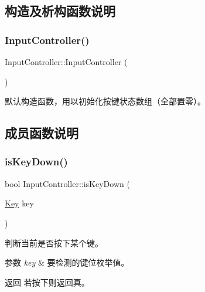\subsection{构造及析构函数说明}
\mbox{\label{class_input_controller_aba927fffeb0bf4c4fd0835d4dfbdfaec}} 
\subsubsection{\texorpdfstring{Input\+Controller()}{InputController()}}
{\footnotesize\ttfamily Input\+Controller\+::\+Input\+Controller (\begin{DoxyParamCaption}{ }\end{DoxyParamCaption})}



默认构造函数，用以初始化按键状态数组（全部置零）。 



\subsection{成员函数说明}
\mbox{\label{class_input_controller_a7ed265c719c06edf5a7294e98739d932}} 
\subsubsection{\texorpdfstring{is\+Key\+Down()}{isKeyDown()}}
{\footnotesize\ttfamily bool Input\+Controller\+::is\+Key\+Down (\begin{DoxyParamCaption}\item[{\hyperlink{class_input_controller_a840a7425e2220e1ef5659a7ea4ba122d}{Key}}]{key }\end{DoxyParamCaption})}



判断当前是否按下某个键。 


\begin{DoxyParams}{参数}
{\em key} & 要检测的键位枚举值。 \\
\hline
\end{DoxyParams}
\begin{DoxyReturn}{返回}
若按下则返回真。 
\end{DoxyReturn}
\mbox{\label{class_input_controller_a2a88542ae1370cf3f5ace3c4bb8813d9}} 
